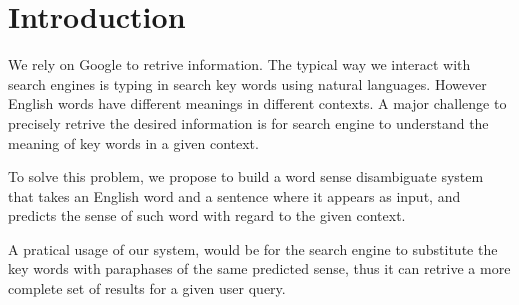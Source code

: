 \section{Introduction}

We rely on Google to retrive information. The typical way we interact with
search engines is typing in search key words using natural languages. However
English words have different meanings in different contexts. A major challenge
to precisely retrive the desired information is for search engine to understand
the meaning of key words in a given context.

To solve this problem, we propose to build a word sense disambiguate system that
takes an English word and a sentence where it appears as input, and predicts the
sense of such word with regard to the given context. 

A pratical usage of our system, would be for the search engine to substitute the
key words with paraphases of the same predicted sense, thus it can retrive a
more complete set of results for a given user query.
